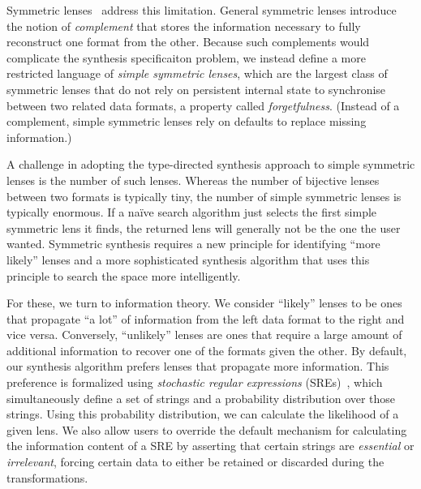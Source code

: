\documentclass[12pt]{article}
\begin{document}
{Symmetric lenses~\cite{HofmannPierceWagner10:POPL} address this
limitation.  General symmetric lenses introduce the notion of 
\textit{complement} that stores the information necessary to fully
reconstruct one format from the other.  Because such complements would
complicate the synthesis specificaiton problem, we instead define a
more restricted language of \textit{simple symmetric lenses}, which
are the largest class of symmetric lenses that do not rely on
persistent internal state to synchronise between two related data
formats, a property called \textit{forgetfulness}.  (Instead of a
complement, simple symmetric lenses rely on defaults to replace
missing information.)

A challenge in adopting the type-directed synthesis approach to simple
symmetric lenses is the number of such lenses.  Whereas the number of
bijective lenses between two formats is typically tiny, the
number of simple symmetric lenses is typically enormous. 
If a na\"ive  search algorithm just selects the first simple symmetric
lens it finds, the returned lens will generally not be the one the
user wanted. Symmetric synthesis requires a new principle for
identifying “more likely” lenses and a more sophisticated synthesis
algorithm that uses this principle to search the space more
intelligently.

For these, we turn to information theory. We consider ``likely'' lenses to
be ones that propagate ``a lot'' of information 
from the left data format to the right and vice versa. Conversely, ``unlikely''
lenses are ones that require a large amount of additional information to recover
one of the formats given the other. By default, our synthesis algorithm prefers
lenses that propagate more information.
This preference is formalized using \emph{stochastic regular expressions}
(SREs)~\cite{stoch-rnn,stoch-def}, which simultaneously define a set of
strings and a probability distribution over those strings.  Using this
probability distribution, we can calculate the likelihood of a given
lens.
We also allow users to override the default mechanism for
calculating the information content of a SRE by
asserting that certain strings are \emph{essential} or \emph{irrelevant},
forcing certain data to either be retained or discarded during the
transformations.



}
\end{document}
